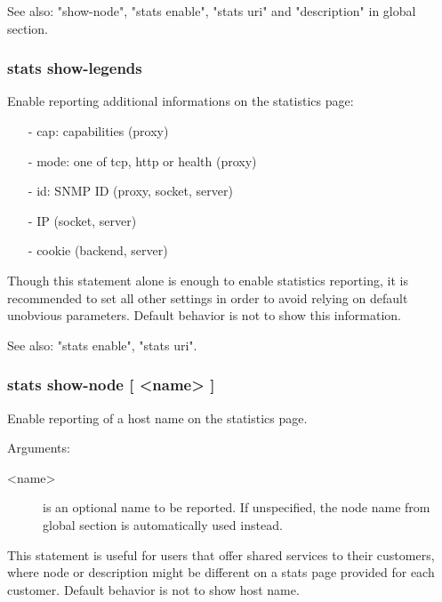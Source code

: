   See also: "show-node", "stats enable", "stats uri" and "description" in
            global section.

\subsubsection{stats show-legends}



  Enable reporting additional informations on the statistics page:
  \begin{itemize}
  \item[-] cap: capabilities (proxy)
  \item[-] mode: one of tcp, http or health (proxy)
  \item[-] id: SNMP ID (proxy, socket, server)
  \item[-] IP (socket, server)
  \item[-] cookie (backend, server)
  \end{itemize}

  Though this statement alone is enough to enable statistics reporting, it is
  recommended to set all other settings in order to avoid relying on default
  unobvious parameters.  Default behavior is not to show this information.

  See also: "stats enable", "stats uri".


\subsubsection[stats show-node]{stats show-node [ <name> ]}


  Enable reporting of a host name on the statistics page.


  Arguments:
  \begin{description}
  \item[<name>] is an optional name to be reported. If unspecified, the
              node name from global section is automatically used instead.
  \end{description}

  This statement is useful for users that offer shared services to their
  customers, where node or description might be different on a stats page
  provided for each customer.  Default behavior is not to show host name.

